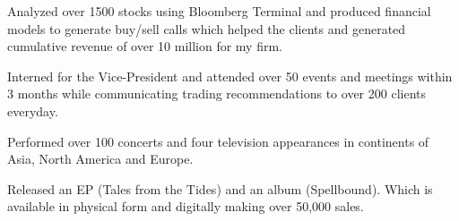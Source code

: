 \documentclass[]{deedy-resume-openfont}
\begin{document}
\begin{minipage}[t]{0.66\textwidth}
\begin{tightemize}
\item Analyzed over 1500 stocks using Bloomberg Terminal and produced financial models to generate buy/sell calls which helped the clients and generated cumulative revenue of over 10 million for my firm.\end{tightemize}
\sectionsep

\begin{tightemize}
\item Interned for the Vice-President and attended over 50 events and meetings within 3 months while communicating trading recommendations to over 200 clients everyday.
\end{tightemize}
\sectionsep


\begin{tightemize}
\item Performed over 100 concerts and four television appearances in continents of Asia, North America and Europe.\item Released an EP (Tales from the Tides) and an album (Spellbound). Which is available in physical form and digitally making over 50,000 sales.
\end{tightemize}
\sectionsep





\end{minipage} 
\end{document}
